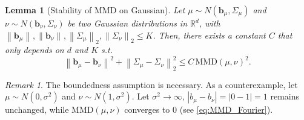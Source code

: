 \documentclass{article} %
\theoremstyle{plain}
\newtheorem{lemma}[theorem]{Lemma}
\theoremstyle{definition}
\theoremstyle{remark}
\newtheorem{remark}[theorem]{Remark}
\newcommand{\R}{\mathbb{R}}
\newcommand{\norm}[2][H^s]{\left\|#2\right\|_{#1}}
\newcommand{\bb}{\mathbf{b}}
\newcommand{\MMD}{\mathrm{MMD}}
\begin{document}
\begin{lemma}[Stability of MMD on Gaussian]\label{lem:MMD_Gaussian}
Let $\mu \sim N(\bb_\mu,\Sigma_\mu)$ and $\nu \sim N(\bb_\nu, \Sigma_\nu)$ be two Gaussian distributions in $\R^d$, with $\norm[]{\bb_\mu}, \norm[]{\bb_\nu}, \norm[2]{\Sigma_\mu}, \norm[2]{\Sigma_\nu} \le K$. Then, there exists a constant $C$ that only depends on $d$ and $K$ s.t.
\begin{equation}\label{eq:MMD_Gaussain_bound}
\norm[]{\bb_\mu-\bb_\nu}^2 + \norm[2]{\Sigma_\mu-\Sigma_\nu}^2 \le C \, \MMD(\mu, \nu)^2.
\end{equation}
\end{lemma}
\begin{remark}
The boundedness assumption is necessary. As a counterexample, let $\mu \sim N(0,\sigma^2)$ and $\nu \sim N(1,\sigma^2)$. Let $\sigma^2 \to \infty$, $|b_\mu-b_\nu|=|0-1|=1$ remains unchanged, while $\MMD(\mu,\nu)$ converges to $0$ (see \eqref{eq:MMD_Fourier}).
\end{remark}
\end{document}
